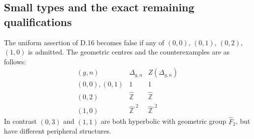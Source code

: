 \subsection{Small types and the exact remaining qualifications}

The uniform assertion of D.16 becomes false if any of $(0,0)$, $(0,1)$,
$(0,2)$, $(1,0)$ is admitted.  The geometric centres and the counterexamples
are as follows:
\[
\begin{array}{c|c|c}
 (g,n)&\Delta_{g,n}&Z(\Delta_{g,n})\\\hline
 (0,0),(0,1)&1&1\\
 (0,2)&\widehat{\mathbb Z}&\widehat{\mathbb Z}\\
 (1,0)&\widehat{\mathbb Z}^{,2}&\widehat{\mathbb Z}^{,2}
\end{array}
\]
In contrast $(0,3)$ and $(1,1)$ are both hyperbolic with geometric group
$\widehat F_2$, but have different peripheral structures.
